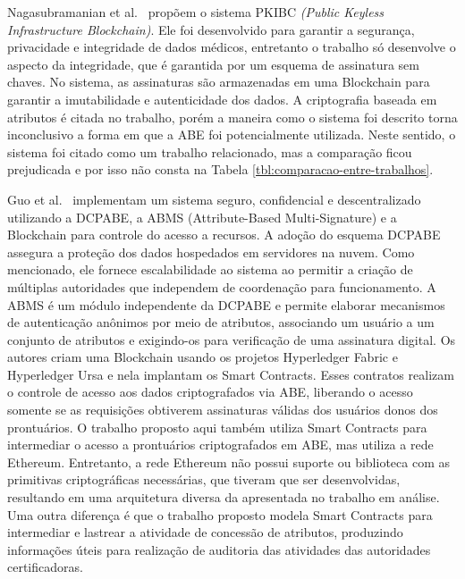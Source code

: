 \documentclass[a4paper,11pt]{article}
\begin{document}
Nagasubramanian et al.~\cite{Nagasubramanian2020} propõem o sistema PKIBC \emph{(Public Keyless Infrastructure Blockchain)}. Ele foi desenvolvido para garantir a segurança, privacidade e integridade de dados médicos, entretanto o trabalho só desenvolve o aspecto da integridade, que é garantida por um esquema de assinatura sem chaves.
No sistema, as assinaturas são armazenadas em uma Blockchain para garantir a imutabilidade e autenticidade dos dados.
A criptografia baseada em atributos é citada no trabalho, porém a maneira como o sistema foi descrito torna inconclusivo a forma em que a ABE foi potencialmente utilizada.
Neste sentido, o sistema foi citado como um trabalho relacionado, mas a comparação ficou prejudicada e por isso não consta na Tabela \ref{tbl:comparacao-entre-trabalhos}.

Guo et al.~\cite{Guo2020} implementam um sistema seguro, confidencial e descentralizado utilizando a DCPABE, a ABMS (Attribute-Based Multi-Signature) e a Blockchain para controle do acesso a recursos.
A adoção do esquema DCPABE assegura a proteção dos dados hospedados em servidores na nuvem. Como mencionado, ele fornece escalabilidade ao sistema ao permitir a criação de múltiplas autoridades que independem de coordenação para funcionamento.
A ABMS é um módulo independente da DCPABE e permite elaborar mecanismos de autenticação anônimos por meio de atributos, associando um usuário a um conjunto de atributos e exigindo-os para verificação de uma assinatura digital.
Os autores criam uma Blockchain usando os projetos Hyperledger Fabric e Hyperledger Ursa e nela implantam os Smart Contracts.
Esses contratos realizam o controle de acesso aos dados criptografados via ABE, liberando o acesso somente se as requisições obtiverem assinaturas válidas dos usuários donos dos prontuários.
O trabalho proposto aqui também utiliza Smart Contracts para intermediar o acesso a prontuários criptografados em ABE, mas utiliza a rede Ethereum. Entretanto, a rede Ethereum não possui suporte ou biblioteca com as primitivas criptográficas necessárias, que tiveram que ser desenvolvidas, resultando em uma arquitetura diversa da apresentada no trabalho em análise.
Uma outra diferença é que o trabalho proposto modela Smart Contracts para intermediar e lastrear a atividade de concessão de atributos, produzindo informações úteis para realização de auditoria das atividades das autoridades certificadoras.
\end{document}
